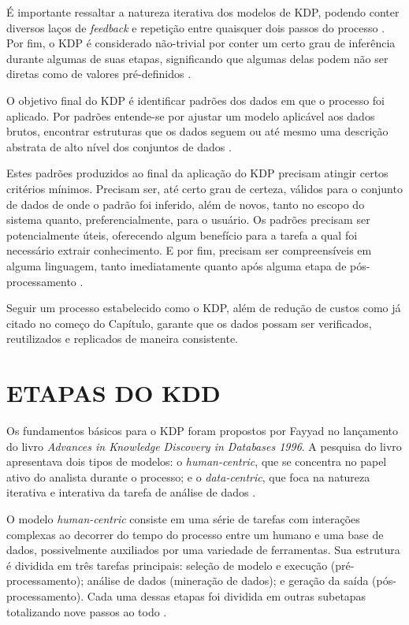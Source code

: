 É importante ressaltar a natureza iterativa dos modelos de KDP, podendo conter diversos laços de \textit{feedback} e repetição entre quaisquer dois passos do processo . Por fim, o KDP é considerado não-trivial por conter um certo grau de inferência durante algumas de suas etapas, significando que algumas delas podem não ser diretas como de valores pré-definidos .

O objetivo final do KDP é identificar padrões dos dados em que o processo foi aplicado. Por padrões entende-se por ajustar um modelo aplicável aos dados brutos, encontrar estruturas que os dados seguem ou até mesmo uma descrição abstrata de alto nível dos conjuntos de dados .

Estes padrões produzidos ao final da aplicação do KDP precisam atingir certos critérios mínimos. Precisam ser, até certo grau de certeza, válidos para o conjunto de dados de onde o padrão foi inferido, além de novos, tanto no escopo do sistema quanto, preferencialmente, para o usuário. Os padrões precisam ser potencialmente úteis, oferecendo algum benefício para a tarefa a qual foi necessário extrair conhecimento. E por fim, precisam ser compreensíveis em alguma linguagem, tanto imediatamente quanto após alguma etapa de pós-processamento .

Seguir um processo estabelecido como o KDP, além de redução de custos como já citado no começo do Capítulo, garante que os dados possam ser verificados, reutilizados e replicados de maneira consistente.

\section{ETAPAS DO KDD}
\label{sec:etapasKDD}

Os fundamentos básicos para o KDP foram propostos por Fayyad no lançamento do livro \textit{Advances in Knowledge Discovery in Databases 1996}. %
A pesquisa do livro apresentava dois tipos de modelos: o \textit{human-centric}, que se concentra no papel ativo do analista durante o processo; e o \textit{data-centric}, que foca na natureza iterativa e interativa da tarefa de análise de dados .

O modelo \textit{human-centric} consiste em uma série de tarefas com interações complexas ao decorrer do tempo do processo entre um humano e uma base de dados, possivelmente auxiliados por uma variedade de ferramentas. Sua estrutura é dividida em três tarefas principais: seleção de modelo e execução (pré-processamento); análise de dados (mineração de dados); e geração da saída (pós-processamento). Cada uma dessas etapas foi dividida em outras subetapas totalizando nove passos ao todo .

